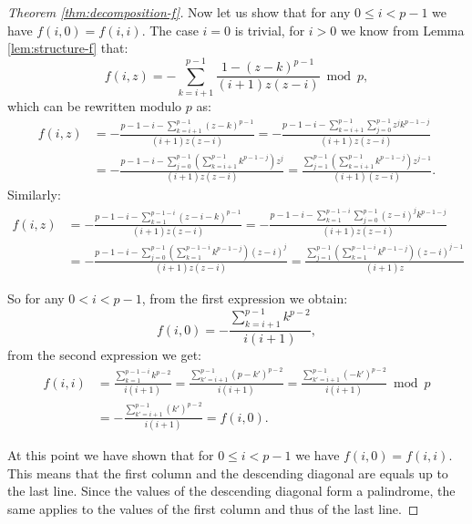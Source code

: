 \begin{proof}[Theorem \ref{thm:decomposition-f}]
    Now let us show that for any $0\leq i < p-1$ we have $f(i,0) = f(i,i)$. The case $i=0$ is trivial, for $i>0$ we know from Lemma \ref{lem:structure-f} that:
    $$ f(i,z) = -\displaystyle\sum_{k=i+1}^{p-1}\frac{1-(z-k)^{p-1}}{(i+1)z(z-i)} \bmod p, $$
    which can be rewritten modulo $p$ as:
    \begin{align*}
      f(i,z) & = -\frac{p-1-i - \displaystyle\sum_{k=i+1}^{p-1}(z-k)^{p-1}}{(i+1)z(z-i)} = -\frac{p-1-i - \displaystyle\sum_{k=i+1}^{p-1}\displaystyle\sum_{j=0}^{p-1}z^j k^{p-1-j}}{(i+1)z(z-i)} \\
             & = -\frac{p-1-i - \displaystyle\sum_{j=0}^{p-1}\left(\displaystyle\sum_{k=i+1}^{p-1} k^{p-1-j}\right)z^j}{(i+1)z(z-i)}  = \frac{\displaystyle\sum_{j=1}^{p-1}\left(\displaystyle\sum_{k=i+1}^{p-1} k^{p-1-j}\right)z^{j-1}}{(i+1)(z-i)}.
    \end{align*}
    Similarly:
    \begin{align*}
      f(i,z) & = -\frac{p-1-i - \displaystyle\sum_{k=1}^{p-1-i}(z-i-k)^{p-1}}{(i+1)z(z-i)} = -\frac{p-1-i - \displaystyle\sum_{k=1}^{p-1-i}\displaystyle\sum_{j=0}^{p-1}(z-i)^j k^{p-1-j}}{(i+1)z(z-i)} \\
             & = -\frac{p-1-i - \displaystyle\sum_{j=0}^{p-1}\left(\displaystyle\sum_{k=1}^{p-1-i} k^{p-1-j}\right)(z-i)^j}{(i+1)z(z-i)}  = \frac{\displaystyle\sum_{j=1}^{p-1}\left(\displaystyle\sum_{k=1}^{p-1-i} k^{p-1-j}\right)(z-i)^{j-1}}{(i+1)z}
    \end{align*}

    So for any $0 < i < p-1$, from the first expression we obtain:
    $$f(i,0) = -\frac{\sum_{k=i+1}^{p-1} k^{p-2}}{i(i+1)},$$
    from the second expression we get:
    \begin{align*}
      f(i,i) &= \frac{\sum_{k=1}^{p-1-i} k^{p-2}}{i(i+1)} = \frac{\sum_{k'=i+1}^{p-1} (p-k')^{p-2}}{i(i+1)} = \frac{\sum_{k'=i+1}^{p-1} (-k')^{p-2}}{i(i+1)} \bmod p \\
      &= -\frac{\sum_{k'=i+1}^{p-1} (k')^{p-2}}{i(i+1)} = f(i,0).
    \end{align*}

    At this point we have shown that for $0\leq i<p-1$ we have $f(i,0) = f(i,i)$. 
    This means that the first column and the descending diagonal are equals up to the last line. 
    Since the values of the descending diagonal form a palindrome, the same applies to the values of the first column and thus of the last line.


\end{proof}
